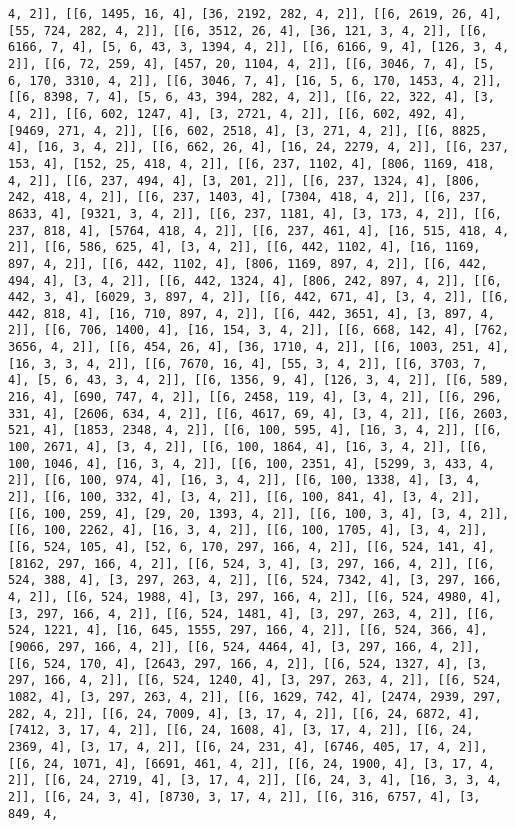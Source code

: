 \documentclass[12pt,fleqn]{article}\usepackage{../../common}
\begin{document}
\begin{verbatim}
4, 2]], [[6, 1495, 16, 4], [36, 2192, 282, 4, 2]], [[6, 2619, 26, 4], [55, 724, 282, 4, 2]], [[6, 3512, 26, 4], [36, 121, 3, 4, 2]], [[6, 6166, 7, 4], [5, 6, 43, 3, 1394, 4, 2]], [[6, 6166, 9, 4], [126, 3, 4, 2]], [[6, 72, 259, 4], [457, 20, 1104, 4, 2]], [[6, 3046, 7, 4], [5, 6, 170, 3310, 4, 2]], [[6, 3046, 7, 4], [16, 5, 6, 170, 1453, 4, 2]], [[6, 8398, 7, 4], [5, 6, 43, 394, 282, 4, 2]], [[6, 22, 322, 4], [3, 4, 2]], [[6, 602, 1247, 4], [3, 2721, 4, 2]], [[6, 602, 492, 4], [9469, 271, 4, 2]], [[6, 602, 2518, 4], [3, 271, 4, 2]], [[6, 8825, 4], [16, 3, 4, 2]], [[6, 662, 26, 4], [16, 24, 2279, 4, 2]], [[6, 237, 153, 4], [152, 25, 418, 4, 2]], [[6, 237, 1102, 4], [806, 1169, 418, 4, 2]], [[6, 237, 494, 4], [3, 201, 2]], [[6, 237, 1324, 4], [806, 242, 418, 4, 2]], [[6, 237, 1403, 4], [7304, 418, 4, 2]], [[6, 237, 8633, 4], [9321, 3, 4, 2]], [[6, 237, 1181, 4], [3, 173, 4, 2]], [[6, 237, 818, 4], [5764, 418, 4, 2]], [[6, 237, 461, 4], [16, 515, 418, 4, 2]], [[6, 586, 625, 4], [3, 4, 2]], [[6, 442, 1102, 4], [16, 1169, 897, 4, 2]], [[6, 442, 1102, 4], [806, 1169, 897, 4, 2]], [[6, 442, 494, 4], [3, 4, 2]], [[6, 442, 1324, 4], [806, 242, 897, 4, 2]], [[6, 442, 3, 4], [6029, 3, 897, 4, 2]], [[6, 442, 671, 4], [3, 4, 2]], [[6, 442, 818, 4], [16, 710, 897, 4, 2]], [[6, 442, 3651, 4], [3, 897, 4, 2]], [[6, 706, 1400, 4], [16, 154, 3, 4, 2]], [[6, 668, 142, 4], [762, 3656, 4, 2]], [[6, 454, 26, 4], [36, 1710, 4, 2]], [[6, 1003, 251, 4], [16, 3, 3, 4, 2]], [[6, 7670, 16, 4], [55, 3, 4, 2]], [[6, 3703, 7, 4], [5, 6, 43, 3, 4, 2]], [[6, 1356, 9, 4], [126, 3, 4, 2]], [[6, 589, 216, 4], [690, 747, 4, 2]], [[6, 2458, 119, 4], [3, 4, 2]], [[6, 296, 331, 4], [2606, 634, 4, 2]], [[6, 4617, 69, 4], [3, 4, 2]], [[6, 2603, 521, 4], [1853, 2348, 4, 2]], [[6, 100, 595, 4], [16, 3, 4, 2]], [[6, 100, 2671, 4], [3, 4, 2]], [[6, 100, 1864, 4], [16, 3, 4, 2]], [[6, 100, 1046, 4], [16, 3, 4, 2]], [[6, 100, 2351, 4], [5299, 3, 433, 4, 2]], [[6, 100, 974, 4], [16, 3, 4, 2]], [[6, 100, 1338, 4], [3, 4, 2]], [[6, 100, 332, 4], [3, 4, 2]], [[6, 100, 841, 4], [3, 4, 2]], [[6, 100, 259, 4], [29, 20, 1393, 4, 2]], [[6, 100, 3, 4], [3, 4, 2]], [[6, 100, 2262, 4], [16, 3, 4, 2]], [[6, 100, 1705, 4], [3, 4, 2]], [[6, 524, 105, 4], [52, 6, 170, 297, 166, 4, 2]], [[6, 524, 141, 4], [8162, 297, 166, 4, 2]], [[6, 524, 3, 4], [3, 297, 166, 4, 2]], [[6, 524, 388, 4], [3, 297, 263, 4, 2]], [[6, 524, 7342, 4], [3, 297, 166, 4, 2]], [[6, 524, 1988, 4], [3, 297, 166, 4, 2]], [[6, 524, 4980, 4], [3, 297, 166, 4, 2]], [[6, 524, 1481, 4], [3, 297, 263, 4, 2]], [[6, 524, 1221, 4], [16, 645, 1555, 297, 166, 4, 2]], [[6, 524, 366, 4], [9066, 297, 166, 4, 2]], [[6, 524, 4464, 4], [3, 297, 166, 4, 2]], [[6, 524, 170, 4], [2643, 297, 166, 4, 2]], [[6, 524, 1327, 4], [3, 297, 166, 4, 2]], [[6, 524, 1240, 4], [3, 297, 263, 4, 2]], [[6, 524, 1082, 4], [3, 297, 263, 4, 2]], [[6, 1629, 742, 4], [2474, 2939, 297, 282, 4, 2]], [[6, 24, 7009, 4], [3, 17, 4, 2]], [[6, 24, 6872, 4], [7412, 3, 17, 4, 2]], [[6, 24, 1608, 4], [3, 17, 4, 2]], [[6, 24, 2369, 4], [3, 17, 4, 2]], [[6, 24, 231, 4], [6746, 405, 17, 4, 2]], [[6, 24, 1071, 4], [6691, 461, 4, 2]], [[6, 24, 1900, 4], [3, 17, 4, 2]], [[6, 24, 2719, 4], [3, 17, 4, 2]], [[6, 24, 3, 4], [16, 3, 3, 4, 2]], [[6, 24, 3, 4], [8730, 3, 17, 4, 2]], [[6, 316, 6757, 4], [3, 849, 4, 
\end{verbatim}
\end{document}
